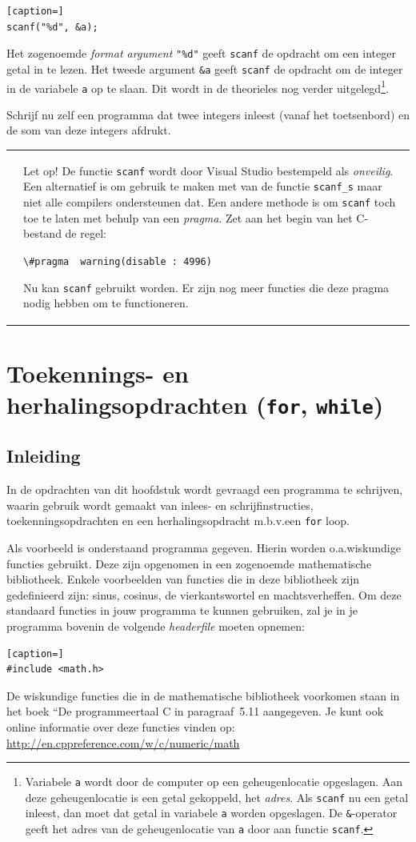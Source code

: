 \documentclass[a4paper,10pt,fleqn,twoside]{article}
\newcommand{\letopscanf}{%
\vspace{4ex plus 1ex minus 1ex}
\begin{mdframed}[outerlinewidth = 1 ,%
roundcorner = 4 pt,%
leftmargin = 40,%
rightmargin = 40,%
backgroundcolor = yellow!40,%
outerlinecolor = red!70!black,%
innertopmargin = \topskip,%
splittopskip = \topskip,%
]
\begin{tabularx}{\linewidth}{m{1cm}X}
\Large\leftpointright & Let op! De functie \lstinline|scanf| wordt door Visual Studio bestempeld als \emph{onveilig}. Een alternatief is om gebruik te maken met van de functie \lstinline|scanf_s| maar niet alle compilers ondersteunen dat. Een andere methode is om \lstinline|scanf| toch toe te laten met behulp van een \emph{pragma}. Zet aan het begin van het C-bestand de regel:

\medskip
\lstinline|\#pragma|\ \ \lstinline|warning(disable : 4996)|
\medskip

Nu kan \lstinline{scanf} gebruikt worden. Er zijn nog meer functies die deze pragma nodig hebben om te functioneren.
\end{tabularx}
\end{mdframed}
\vspace{4ex plus 1ex minus 1ex}
}
\begin{document}
\begin{lstlisting}[caption=]
scanf("%d", &a);
\end{lstlisting}

Het  zogenoemde \textsl{format argument} \lstinline|"%d"| geeft \lstinline|scanf| de opdracht om een integer getal in te lezen. Het tweede argument \lstinline|&a| geeft \lstinline|scanf| de opdracht om de integer in de variabele \lstinline|a| op te slaan. Dit wordt in de theorieles nog verder uitgelegd\footnote{Variabele \lstinline|a| wordt door de computer op een geheugenlocatie opgeslagen. Aan deze geheugenlocatie is een getal gekoppeld, het \textsl{adres}. Als \lstinline|scanf| nu een getal inleest, dan moet dat getal in variabele \lstinline|a| worden opgeslagen. De \lstinline|&|-operator geeft het adres van de geheugenlocatie van \lstinline|a| door aan functie \lstinline|scanf|.}.

Schrijf nu zelf een programma dat twee integers inleest (vanaf het toetsenbord) en de som van deze integers afdrukt.

\bigskip
\letopscanf


\clearpage
\section{Toekennings- en herhalingsopdrachten (\texttt{for}, \texttt{while})}

\subsection{Inleiding}

In de opdrachten van dit hoofdstuk wordt gevraagd een programma te schrijven, waarin gebruik wordt gemaakt van inlees- en schrijfinstructies, toekenningsopdrachten en een herhalingsopdracht m.b.v.\@ een \lstinline|for| loop. 

Als voorbeeld is onderstaand programma gegeven. Hierin worden o.a.\@ wiskundige functies gebruikt. Deze zijn opgenomen in een zogenoemde mathematische bibliotheek. Enkele voorbeelden van functies die in deze bibliotheek zijn gedefinieerd zijn: sinus, cosinus, de vierkantswortel en machtsverheffen. Om deze standaard functies in jouw programma te kunnen gebruiken, zal je in je programma bovenin de volgende \textsl{headerfile} moeten opnemen: 

\begin{lstlisting}[caption=]
#include <math.h>
\end{lstlisting}

De wiskundige functies die in de mathematische bibliotheek voorkomen staan in het boek “De programmeertaal C in paragraaf~5.11 aangegeven. Je kunt ook online informatie over deze functies vinden op: \url{http://en.cppreference.com/w/c/numeric/math} 
\end{document}
